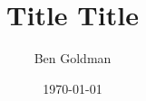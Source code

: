\documentclass{beamer}
\title{Title Title}
\author{Ben Goldman}
\date{\today}
\begin{document}
\begin{frame}
\begin{columns}
  \begin{column}{0.3\textwidth}
  \end{column}
  \begin{column}{0.4\textwidth}
    \maketitle
  \end{column}
  \begin{column}{0.3\textwidth}
  \end{column}
\end{columns}
\end{frame}
\end{document}
